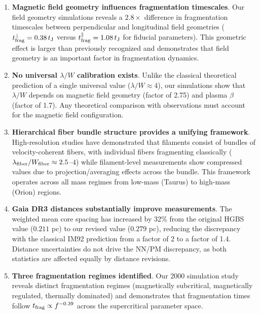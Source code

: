 \documentclass[twoside,twocolumn]{mnras}
\begin{document}
\begin{enumerate}
    \item \textbf{Magnetic field geometry influences fragmentation timescales}. Our field geometry simulations reveals a $2.8\times$ difference in fragmentation timescales between perpendicular and longitudinal field geometries ($t_{\rm frag}^{\perp} = 0.38\,t_{\rm J}$ versus $t_{\rm frag}^{\parallel} = 1.08\,t_{\rm J}$ for fiducial parameters). This geometric effect is larger than previously recognized and demonstrates that field geometry is an important factor in fragmentation dynamics.

    \item \textbf{No universal $\lambda/W$ calibration exists}. Unlike the classical theoretical prediction of a single universal value ($\lambda/W \approx 4$), our simulations show that $\lambda/W$ depends on magnetic field geometry (factor of 2.75) and plasma $\beta$ (factor of 1.7). Any theoretical comparison with observations must account for the magnetic field configuration.

    \item \textbf{Hierarchical fiber bundle structure provides a unifying framework}. High-resolution studies have demonstrated that filaments consist of bundles of velocity-coherent fibers, with individual fibers fragmenting classically ($\lambda_{\rm fiber}/W_{\rm fiber} \approx 2.5$--$4$) while filament-level measurements show compressed values due to projection/averaging effects across the bundle. This framework operates across all mass regimes from low-mass (Taurus) to high-mass (Orion) regions.

    \item \textbf{Gaia DR3 distances substantially improve measurements}. The weighted mean core spacing has increased by 32\% from the original HGBS value ($0.211$ pc) to our revised value ($0.279$ pc), reducing the discrepancy with the classical IM92 prediction from a factor of 2 to a factor of 1.4. Distance uncertainties do not drive the NN/PM discrepancy, as both statistics are affected equally by distance revisions.

    \item \textbf{Three fragmentation regimes identified}. Our 2000 simulation study reveals distinct fragmentation regimes (magnetically subcritical, magnetically regulated, thermally dominated) and demonstrates that fragmentation times follow $t_{\rm frag} \propto f^{-0.39}$ across the supercritical parameter space.
\end{enumerate}
\end{document}
